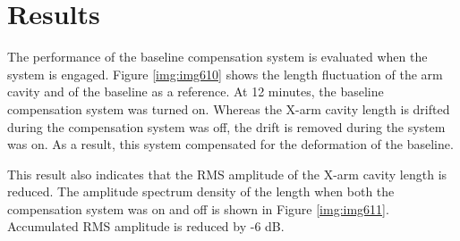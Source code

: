 \section{Results} \label{sec:sec52}
The performance of the baseline compensation system is evaluated when the system is engaged. Figure \ref{img:img610} shows the length fluctuation of the arm cavity and of the baseline as a reference. At 12 minutes, the baseline compensation system was turned on. Whereas the X-arm cavity length is drifted during the compensation system was off, the drift is removed during the system was on. As a result, this system compensated for the deformation of the baseline.

This result also indicates that the RMS amplitude of the X-arm cavity length is reduced. The amplitude spectrum density of the length when both the compensation system was on and off is shown in Figure \ref{img:img611}. Accumulated RMS amplitude is reduced by -6 dB.

